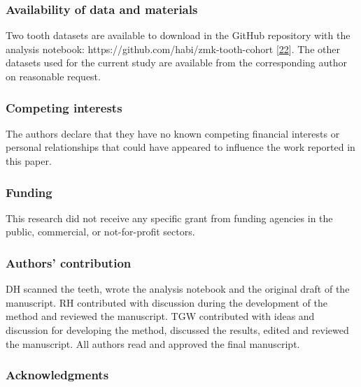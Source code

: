 \documentclass[
  american,
]{article}
\begin{document}
\hypertarget{availability-of-data-and-materials}{%
\subsubsection{Availability of data and materials}\label{availability-of-data-and-materials}}

Two tooth datasets are available to download in the GitHub repository with the analysis notebook: https://github.com/habi/zmk-tooth-cohort {[}\protect\hyperlink{ref-tZRGGuMm}{22}{]}.
The other datasets used for the current study are available from the corresponding author on reasonable request.

\hypertarget{competing-interests}{%
\subsubsection{Competing interests}\label{competing-interests}}

The authors declare that they have no known competing financial interests or personal relationships that could have appeared to influence the work reported in this paper.

\hypertarget{funding}{%
\subsubsection{Funding}\label{funding}}

This research did not receive any specific grant from funding agencies in the public, commercial, or not-for-profit sectors.

\hypertarget{authors-contribution}{%
\subsubsection{Authors' contribution}\label{authors-contribution}}

DH scanned the teeth, wrote the analysis notebook and the original draft of the manuscript.
RH contributed with discussion during the development of the method and reviewed the manuscript.
TGW contributed with ideas and discussion for developing the method, discussed the results, edited and reviewed the manuscript.
All authors read and approved the final manuscript.

\hypertarget{acknowledgments}{%
\subsubsection{Acknowledgments}\label{acknowledgments}}
\end{document}

